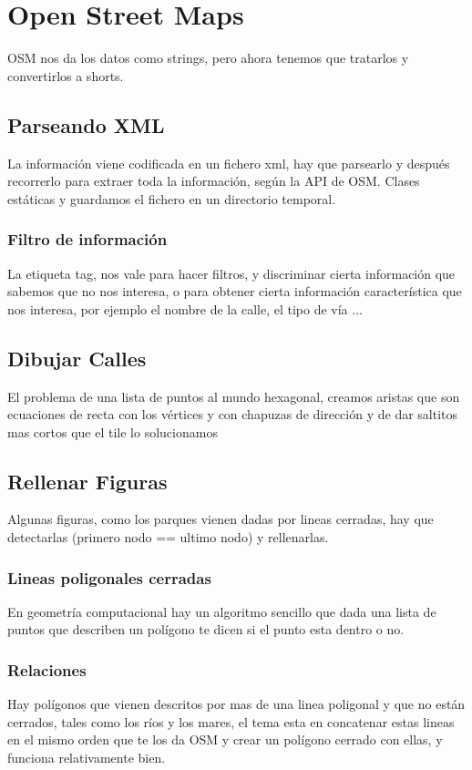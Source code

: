 \section*{Open Street Maps}
OSM nos da los datos como strings, pero ahora tenemos que tratarlos y
convertirlos a shorts.
\subsection*{Parseando XML}
La información viene codificada en un fichero xml, hay que parsearlo y después
recorrerlo para extraer toda la información, según la API de OSM. Clases
estáticas y guardamos el fichero en un directorio temporal.
\subsubsection*{Filtro de información}
La etiqueta tag, nos vale para hacer filtros, y discriminar cierta información
que sabemos que no nos interesa, o para obtener cierta información
característica que nos interesa, por ejemplo el nombre de la calle, el tipo de
vía ...
\subsection*{Dibujar Calles}
El problema de una lista de puntos al mundo hexagonal, creamos aristas que son
ecuaciones de recta con los vértices y con chapuzas de dirección y de dar
saltitos mas cortos que el tile lo solucionamos
\subsection*{Rellenar Figuras}
Algunas figuras, como los parques vienen dadas por lineas cerradas, hay que
detectarlas (primero nodo == ultimo nodo) y rellenarlas.

\subsubsection*{Lineas poligonales cerradas}
En geometría computacional hay un algoritmo sencillo que dada una lista de
puntos que describen un polígono te dicen si el punto esta dentro o no.
\subsubsection*{Relaciones}
Hay polígonos que vienen descritos por mas de una linea poligonal y que no
están cerrados, tales como los ríos y los mares, el tema esta en concatenar
estas lineas en el mismo orden que te los da OSM y crear un polígono cerrado
con ellas, y funciona relativamente bien.
